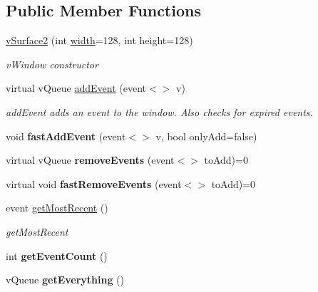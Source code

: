 \subsection*{Public Member Functions}
\begin{DoxyCompactItemize}
\item 
\hyperlink{classev_1_1vSurface2_ada6aeb852479aa111b1f5ad32ac1286b}{v\+Surface2} (int \hyperlink{classev_1_1vSurface2_a1aa8027816352a15d5b9bf1f26f48e76}{width}=128, int height=128)
\begin{DoxyCompactList}\small\item\em v\+Window constructor \end{DoxyCompactList}\item 
virtual v\+Queue \hyperlink{classev_1_1vSurface2_a6dee662976048b73d7b19e45871352da}{add\+Event} (event$<$$>$ v)
\begin{DoxyCompactList}\small\item\em add\+Event adds an event to the window. Also checks for expired events. \end{DoxyCompactList}\item 
void {\bfseries fast\+Add\+Event} (event$<$$>$ v, bool only\+Add=false)\hypertarget{classev_1_1vSurface2_a311f0fb7297ee4a070755308e9271398}{}\label{classev_1_1vSurface2_a311f0fb7297ee4a070755308e9271398}

\item 
virtual v\+Queue {\bfseries remove\+Events} (event$<$$>$ to\+Add)=0\hypertarget{classev_1_1vSurface2_af35870c14a5c94dc7522bdfcf76df2cb}{}\label{classev_1_1vSurface2_af35870c14a5c94dc7522bdfcf76df2cb}

\item 
virtual void {\bfseries fast\+Remove\+Events} (event$<$$>$ to\+Add)=0\hypertarget{classev_1_1vSurface2_a956e6ab8f419554958961fbbca68029b}{}\label{classev_1_1vSurface2_a956e6ab8f419554958961fbbca68029b}

\item 
event \hyperlink{classev_1_1vSurface2_af84a860e057aea43831e8e6d16107cd4}{get\+Most\+Recent} ()
\begin{DoxyCompactList}\small\item\em get\+Most\+Recent \end{DoxyCompactList}\item 
int {\bfseries get\+Event\+Count} ()\hypertarget{classev_1_1vSurface2_a67906f1ecd7fab30f1d0f7218388234e}{}\label{classev_1_1vSurface2_a67906f1ecd7fab30f1d0f7218388234e}

\item 
v\+Queue {\bfseries get\+Everything} ()\hypertarget{classev_1_1vSurface2_a7897c4e7c034f36f86d29e14e36c2ca4}{}\label{classev_1_1vSurface2_a7897c4e7c034f36f86d29e14e36c2ca4}


\end{DoxyCompactItemize}
